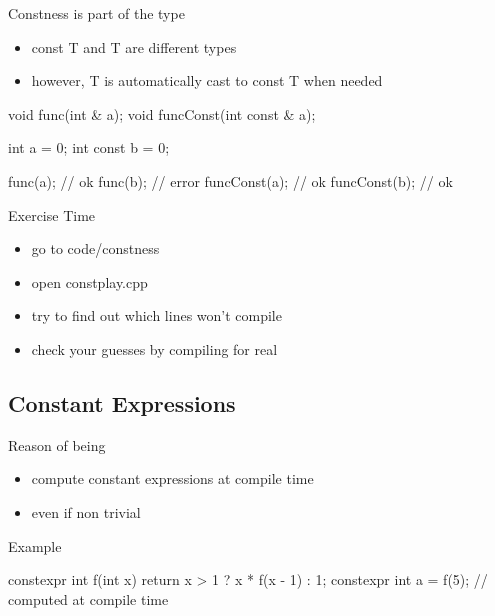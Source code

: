 \begin{frame}[fragile]
  \begin{block}{Constness is part of the type}
    \begin{itemize}
    \item const T and T are different types
    \item however, T is automatically cast to const T when needed
    \end{itemize}
  \end{block}
  \begin{cppcode}
    void func(int & a);
    void funcConst(int const & a);

    int a = 0;
    int const b = 0;

    func(a);      // ok
    func(b);      // error
    funcConst(a); // ok
    funcConst(b); // ok
  \end{cppcode}
\end{frame}

\begin{frame}[fragile]
  \begin{alertblock}{Exercise Time}
    \begin{itemize}
    \item go to code/constness
    \item open constplay.cpp
    \item try to find out which lines won't compile
    \item check your guesses by compiling for real
    \end{itemize}
  \end{alertblock}
\end{frame}

\subsection[cstexpr]{Constant Expressions}

\begin{frame}[fragile]
  \begin{block}{Reason of being}
    \begin{itemize}
    \item compute constant expressions at compile time
    \item even if non trivial
    \end{itemize}
  \end{block}
  \pause
  \begin{exampleblock}{Example}
    \begin{cppcode*}{}
      constexpr int f(int x) {
        return x > 1 ? x * f(x - 1) : 1;
      }
      constexpr int a = f(5); // computed at compile time
    \end{cppcode*}
  \end{exampleblock}
\end{frame}

